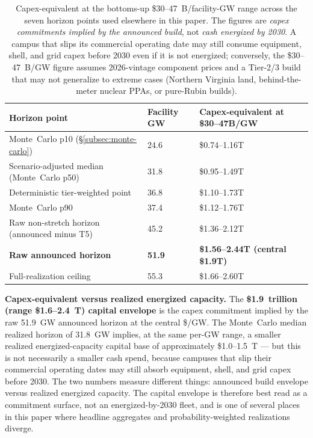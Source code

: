 \begin{table}[h]
\centering
\small
\begin{tabular}{@{}L{6.4cm}R{2.0cm}R{3.6cm}@{}}
\toprule
\textbf{Horizon point} & \textbf{Facility GW} & \textbf{Capex-equivalent at \$30--47B/GW} \\
\midrule
Monte~Carlo p10 (\S\ref{subsec:monte-carlo}) & 24.6 & \$0.74--1.16T \\
Scenario-adjusted median (Monte~Carlo p50) & 31.8 & \$0.95--1.49T \\
Deterministic tier-weighted point & 36.8 & \$1.10--1.73T \\
Monte~Carlo p90 & 37.4 & \$1.12--1.76T \\
Raw non-stretch horizon (announced minus T5) & 45.2 & \$1.36--2.12T \\
\textbf{Raw announced horizon} & \textbf{51.9} & \textbf{\$1.56--2.44T (central \$1.9T)} \\
Full-realization ceiling & 55.3 & \$1.66--2.60T \\
\bottomrule
\end{tabular}
\caption{Capex-equivalent at the bottoms-up \$30--47~B/facility-GW range across the seven horizon points used elsewhere in this paper. The figures are \emph{capex commitments implied by the announced build}, not \emph{cash energized by 2030}. A campus that slips its commercial operating date may still consume equipment, shell, and grid capex before 2030 even if it is not energized; conversely, the \$30--47~B/GW figure assumes 2026-vintage component prices and a Tier-2/3 build that may not generalize to extreme cases (Northern Virginia land, behind-the-meter nuclear PPAs, or pure-Rubin builds).}
\label{tab:scaling-the-unit}
\end{table}

\textbf{Capex-equivalent versus realized energized capacity.} The \textbf{\$1.9~trillion (range \$1.6--2.4~T) capital envelope} is the capex commitment implied by the raw 51.9~GW announced horizon at the central \$/GW. The Monte~Carlo median realized horizon of 31.8~GW implies, at the same per-GW range, a smaller realized energized-capacity capital base of approximately \$1.0--1.5~T --- but this is not necessarily a smaller cash spend, because campuses that slip their commercial operating dates may still absorb equipment, shell, and grid capex before 2030. The two numbers measure different things: announced build envelope versus realized energized capacity. The capital envelope is therefore best read as a commitment surface, not an energized-by-2030 fleet, and is one of several places in this paper where headline aggregates and probability-weighted realizations diverge.

